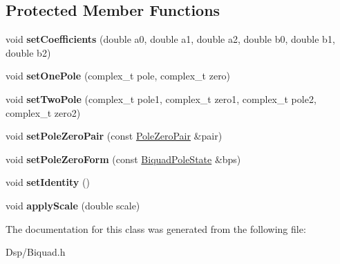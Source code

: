 \subsection*{Protected Member Functions}
\begin{DoxyCompactItemize}
\item 
\hypertarget{classDsp_1_1BiquadBase_a2bcb34fdba5ba9b198f14db8a7d73224}{void {\bfseries set\-Coefficients} (double a0, double a1, double a2, double b0, double b1, double b2)}\label{classDsp_1_1BiquadBase_a2bcb34fdba5ba9b198f14db8a7d73224}

\item 
\hypertarget{classDsp_1_1BiquadBase_a7e61ccbabe0135c14696550f44605136}{void {\bfseries set\-One\-Pole} (complex\-\_\-t pole, complex\-\_\-t zero)}\label{classDsp_1_1BiquadBase_a7e61ccbabe0135c14696550f44605136}

\item 
\hypertarget{classDsp_1_1BiquadBase_a106e3a9b65c42879b3bf0d938a2271a3}{void {\bfseries set\-Two\-Pole} (complex\-\_\-t pole1, complex\-\_\-t zero1, complex\-\_\-t pole2, complex\-\_\-t zero2)}\label{classDsp_1_1BiquadBase_a106e3a9b65c42879b3bf0d938a2271a3}

\item 
\hypertarget{classDsp_1_1BiquadBase_a23b196c3a138fa434722c4cfaf27974b}{void {\bfseries set\-Pole\-Zero\-Pair} (const \hyperlink{structDsp_1_1PoleZeroPair}{Pole\-Zero\-Pair} \&pair)}\label{classDsp_1_1BiquadBase_a23b196c3a138fa434722c4cfaf27974b}

\item 
\hypertarget{classDsp_1_1BiquadBase_a2b70984b149579be8eeba9a9062710b6}{void {\bfseries set\-Pole\-Zero\-Form} (const \hyperlink{structDsp_1_1BiquadPoleState}{Biquad\-Pole\-State} \&bps)}\label{classDsp_1_1BiquadBase_a2b70984b149579be8eeba9a9062710b6}

\item 
\hypertarget{classDsp_1_1BiquadBase_a80b488ad65057cb6c2e7371f4b4a3b44}{void {\bfseries set\-Identity} ()}\label{classDsp_1_1BiquadBase_a80b488ad65057cb6c2e7371f4b4a3b44}

\item 
\hypertarget{classDsp_1_1BiquadBase_a4836f292e091878cf92bf844433d169b}{void {\bfseries apply\-Scale} (double scale)}\label{classDsp_1_1BiquadBase_a4836f292e091878cf92bf844433d169b}

\end{DoxyCompactItemize}


The documentation for this class was generated from the following file\-:\begin{DoxyCompactItemize}
\item 
Dsp/Biquad.\-h\end{DoxyCompactItemize}
